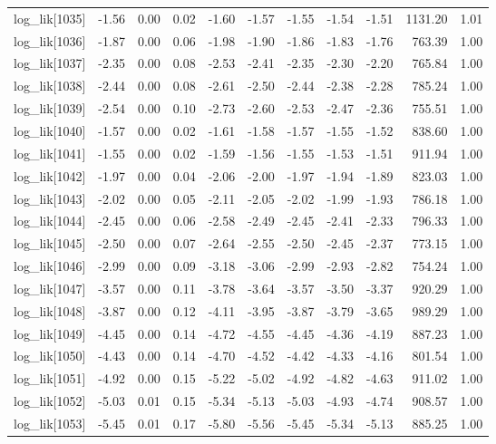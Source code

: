 \begin{table}[ht]
\begin{tabular}{rrrrrrrrrrr}
  log\_lik[1035] & -1.56 & 0.00 & 0.02 & -1.60 & -1.57 & -1.55 & -1.54 & -1.51 & 1131.20 & 1.01 \\ 
  log\_lik[1036] & -1.87 & 0.00 & 0.06 & -1.98 & -1.90 & -1.86 & -1.83 & -1.76 & 763.39 & 1.00 \\ 
  log\_lik[1037] & -2.35 & 0.00 & 0.08 & -2.53 & -2.41 & -2.35 & -2.30 & -2.20 & 765.84 & 1.00 \\ 
  log\_lik[1038] & -2.44 & 0.00 & 0.08 & -2.61 & -2.50 & -2.44 & -2.38 & -2.28 & 785.24 & 1.00 \\ 
  log\_lik[1039] & -2.54 & 0.00 & 0.10 & -2.73 & -2.60 & -2.53 & -2.47 & -2.36 & 755.51 & 1.00 \\ 
  log\_lik[1040] & -1.57 & 0.00 & 0.02 & -1.61 & -1.58 & -1.57 & -1.55 & -1.52 & 838.60 & 1.00 \\ 
  log\_lik[1041] & -1.55 & 0.00 & 0.02 & -1.59 & -1.56 & -1.55 & -1.53 & -1.51 & 911.94 & 1.00 \\ 
  log\_lik[1042] & -1.97 & 0.00 & 0.04 & -2.06 & -2.00 & -1.97 & -1.94 & -1.89 & 823.03 & 1.00 \\ 
  log\_lik[1043] & -2.02 & 0.00 & 0.05 & -2.11 & -2.05 & -2.02 & -1.99 & -1.93 & 786.18 & 1.00 \\ 
  log\_lik[1044] & -2.45 & 0.00 & 0.06 & -2.58 & -2.49 & -2.45 & -2.41 & -2.33 & 796.33 & 1.00 \\ 
  log\_lik[1045] & -2.50 & 0.00 & 0.07 & -2.64 & -2.55 & -2.50 & -2.45 & -2.37 & 773.15 & 1.00 \\ 
  log\_lik[1046] & -2.99 & 0.00 & 0.09 & -3.18 & -3.06 & -2.99 & -2.93 & -2.82 & 754.24 & 1.00 \\ 
  log\_lik[1047] & -3.57 & 0.00 & 0.11 & -3.78 & -3.64 & -3.57 & -3.50 & -3.37 & 920.29 & 1.00 \\ 
  log\_lik[1048] & -3.87 & 0.00 & 0.12 & -4.11 & -3.95 & -3.87 & -3.79 & -3.65 & 989.29 & 1.00 \\ 
  log\_lik[1049] & -4.45 & 0.00 & 0.14 & -4.72 & -4.55 & -4.45 & -4.36 & -4.19 & 887.23 & 1.00 \\ 
  log\_lik[1050] & -4.43 & 0.00 & 0.14 & -4.70 & -4.52 & -4.42 & -4.33 & -4.16 & 801.54 & 1.00 \\ 
  log\_lik[1051] & -4.92 & 0.00 & 0.15 & -5.22 & -5.02 & -4.92 & -4.82 & -4.63 & 911.02 & 1.00 \\ 
  log\_lik[1052] & -5.03 & 0.01 & 0.15 & -5.34 & -5.13 & -5.03 & -4.93 & -4.74 & 908.57 & 1.00 \\ 
  log\_lik[1053] & -5.45 & 0.01 & 0.17 & -5.80 & -5.56 & -5.45 & -5.34 & -5.13 & 885.25 & 1.00 \\ 

\end{tabular}
\end{table}
